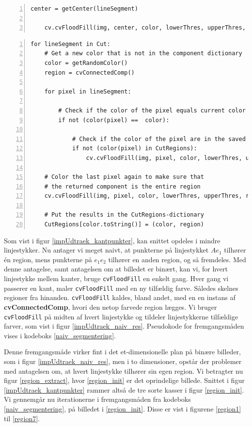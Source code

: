 {\begin{lstlisting}[caption={Naiv pseudokode til segmentering af binære
    billeder.},captionpos=b,label={naiv_segmentering},numbers=left,
    frame=tb, breaklines=false, float=p]
    center = getCenter(lineSegment)

    cv.cvFloodFill(img, center, color, lowerThres, upperThres, region)

\end{lstlisting}

\begin{lstlisting}[caption={Original pseudokode til udtrækning af
    regioner. Denne kan returnere den samme region flere
    gange.},captionpos=b,label={pseudo_udtraek_org},numbers=left,
    frame=tb, breaklines=false, float=h]
for lineSegment in Cut:
    # Get a new color that is not in the component dictionary
    color = getRandomColor()
    region = cvConnectedComp()

    for pixel in lineSegment:

        # Check if the color of the pixel equals current color
        if not (color(pixel) ==  color):

            # Check if the color of the pixel are in the saved regions
            if not (color(pixel) in CutRegions):
                cv.cvFloodFill(img, pixel, color, lowerThres, upperThres, region)

    # Color the last pixel again to make sure that
    # the returned component is the entire region
    cv.cvFloodFill(img, pixel, color, lowerThres, upperThres, region)

    # Put the results in the CutRegions-dictionary
    CutRegions[color.toString()] = (color, region)
\end{lstlisting}

Som vist i figur \ref{impUdtraek_kantpunkter}, kan snittet opdeles i
mindre linjestykker. Nu antager vi meget naivt, at punkterne på
linjestykket $Ae_1$ tilhører én region, mens punkterne på $e_1e_2$
tilhører en anden region, og så fremdeles. Med denne antagelse, samt
antagelsen om at billedet er binært, kan vi, for hvert linjestykke
mellem kanter, bruge \texttt{cvFloodFill} en enkelt gang. Hver gang vi
passerer en kant, maler \texttt{cvFloodFill} med en ny tilfældig farve.
Således skelnes regioner fra hinanden. \texttt{cvFloodFill} kaldes,
bland andet, med en en instans af \textbf{cvConnectedComp}, hvori den
netop farvede region lægges. Vi bruger \texttt{cvFloodFill} på midten af
hvert linjestykke og tildeler linjestykkerne tilfældige farver, som vist
i figur \ref{impUdtraek_naiv_res}. Pseudokode for fremgangsmåden vises i
kodeboks \ref{naiv_segmentering}.

Denne fremgangsmåde virker fint i det et-dimensionelle plan på binære
billeder, som i figur \ref{impUdtraek_naiv_res}, men i to dimensioner,
opstår der problemer med antagelsen om, at hvert linjestykke tilhører
sin egen region. Vi betragter nu figur \ref{region_extract}, hvor
\ref{region_init} er det oprindelige billede.  Snittet i figur
\ref{impUdtraek_kantpunkter} rammer altså de tre sorte kasser i figur
\ref{region_init}. Vi gennemgår nu iterationerne i fremgangsmåden fra
kodeboks \ref{naiv_segmentering}, på billedet i \ref{region_init}.
Disse er vist i figurene \ref{region1} til \ref{region7}.
\clearpage

}
